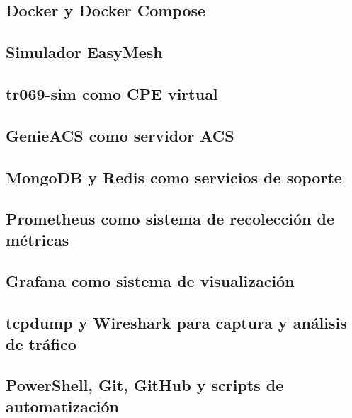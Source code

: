 \subsection{Docker y Docker Compose}
\label{subsec:docker-docker-compose}

\subsection{Simulador EasyMesh}
\label{subsec:simulador-easymesh}

\subsection{tr069-sim como CPE virtual}
\label{subsec:tr069-sim-cpe-virtual}

\subsection{GenieACS como servidor ACS}
\label{subsec:genieacs-servidor-acs}

\subsection{MongoDB y Redis como servicios de soporte}
\label{subsec:mongodb-redis-servicios-soporte}

\subsection{Prometheus como sistema de recolección de métricas}
\label{subsec:prometheus-recoleccion-metricas}

\subsection{Grafana como sistema de visualización}
\label{subsec:grafana-sistema-visualizacion}

\subsection{tcpdump y Wireshark para captura y análisis de tráfico}
\label{subsec:tcpdump-wireshark-captura-analisis}

\subsection{PowerShell, Git, GitHub y scripts de automatización}
\label{subsec:powershell-git-github-scripts}



